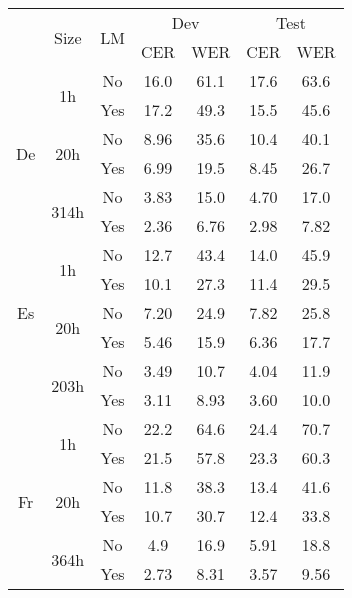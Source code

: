 \begin{table}[ht]
    \centering
    \small
    \begin{tabular}{c|c|c|cc|cc}
    \toprule
    \multirow{2}{*}{} & \multirow{2}{*}{Size} & \multirow{2}{*}{LM} & \multicolumn{2}{c|}{Dev} & \multicolumn{2}{c}{Test} \\
    & & & CER & WER & CER & WER \\
    \midrule
    \multirow{6}{*}{De} & \multirow{2}{*}{1h} & No & 16.0 & 61.1 & 17.6 & 63.6 \\
    & & Yes & 17.2 & 49.3 & 15.5 & 45.6 \\
    & \multirow{2}{*}{20h} & No  & 8.96 & 35.6 & 10.4 & 40.1 \\
    & & Yes & 6.99 & 19.5 & 8.45 & 26.7 \\
    & \multirow{2}{*}{314h} & No  & 3.83 & 15.0  & 4.70 &  17.0 \\
    && Yes  & 2.36  & 6.76  & 2.98 &  7.82 \\
    \midrule
    \multirow{5}{*}{Es} & \multirow{2}{*}{1h} & No & 12.7 & 43.4 & 14.0 & 45.9 \\
    & & Yes & 10.1 & 27.3 & 11.4 & 29.5 \\
    & \multirow{2}{*}{20h} &No  & 7.20 & 24.9 & 7.82 & 25.8 \\
    & & Yes & 5.46 & 15.9 & 6.36 & 17.7 \\
    & \multirow{2}{*}{203h} & No & 3.49 &  10.7 &  4.04 &  11.9  \\
    & & Yes & 3.11  & 8.93 & 3.60 & 10.0 \\
    \midrule
    \multirow{6}{*}{Fr} & \multirow{2}{*}{1h} & No & 22.2 & 64.6 & 24.4 & 70.7  \\
    & & Yes & 21.5 & 57.8 & 23.3 & 60.3 \\
    & \multirow{2}{*}{20h} & No & 11.8  & 38.3 & 13.4 & 41.6 \\
    & & Yes & 10.7 & 30.7 & 12.4 & 33.8\\
    &  \multirow{2}{*}{364h} & No & 4.9 & 16.9 & 5.91 & 18.8  \\
    && Yes & 2.73 & 8.31 & 3.57 & 9.56  \\

\end{tabular}
\end{table}
